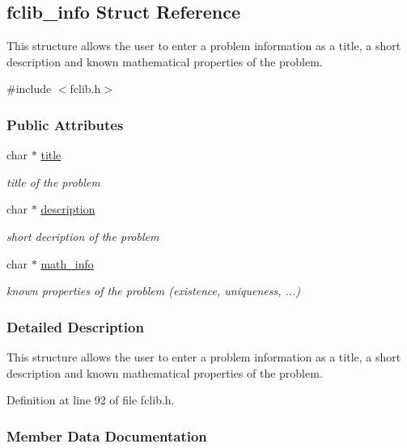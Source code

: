 \hypertarget{structfclib__info}{}\subsection{fclib\+\_\+info Struct Reference}
\label{structfclib__info}


This structure allows the user to enter a problem information as a title, a short description and known mathematical properties of the problem.  




{\ttfamily \#include $<$fclib.\+h$>$}

\subsubsection*{Public Attributes}
\begin{DoxyCompactItemize}
\item 
char $\ast$ \hyperlink{structfclib__info_a4ea1b298e3aa7228a5f2a55f711f41d2}{title}
\begin{DoxyCompactList}\small\item\em title of the problem \end{DoxyCompactList}\item 
char $\ast$ \hyperlink{structfclib__info_a0c1680fee67eaf7b20c436a775d4f35d}{description}
\begin{DoxyCompactList}\small\item\em short decription of the problem \end{DoxyCompactList}\item 
char $\ast$ \hyperlink{structfclib__info_ad6dadb3af34a719e5ec3cab2d499c7f2}{math\+\_\+info}
\begin{DoxyCompactList}\small\item\em known properties of the problem (existence, uniqueness, ...) \end{DoxyCompactList}\end{DoxyCompactItemize}


\subsubsection{Detailed Description}
This structure allows the user to enter a problem information as a title, a short description and known mathematical properties of the problem. 

Definition at line 92 of file fclib.\+h.



\subsubsection{Member Data Documentation}
\hypertarget{structfclib__info_a4ea1b298e3aa7228a5f2a55f711f41d2}{}
